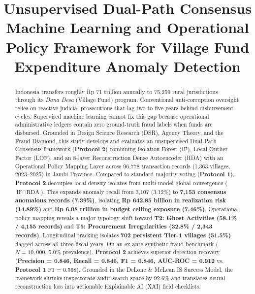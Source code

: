 \documentclass[conference]{IEEEtran}
\begin{document}
\title{Unsupervised Dual-Path Consensus Machine Learning and Operational Policy Framework for Village Fund Expenditure Anomaly Detection}

\author{
}

\maketitle

\begin{abstract}
Indonesia transfers roughly Rp 71 trillion annually to 75,259 rural jurisdictions through its \textit{Dana Desa} (Village Fund) program. Conventional anti-corruption oversight relies on reactive judicial prosecutions that lag two to five years behind disbursement cycles. Supervised machine learning cannot fix this gap because operational administrative ledgers contain zero ground-truth fraud labels when funds are disbursed. Grounded in Design Science Research (DSR), Agency Theory, and the Fraud Diamond, this study develops and evaluates an unsupervised Dual-Path Consensus framework (\textbf{Protocol 2}) combining Isolation Forest (IF), Local Outlier Factor (LOF), and an 8-layer Reconstruction Dense Autoencoder (RDA) with an Operational Policy Mapping Layer across 96,778 transaction records (1,363 villages, 2023--2025) in Jambi Province. Compared to standard majority voting (\textbf{Protocol 1}), \textbf{Protocol 2} decouples local density isolates from multi-model global convergence ($\text{IF} \cap \text{RDA}$). This expands anomaly recall from 3,107 (3.12\%) to \textbf{7,153 consensus anomalous records (7.39\%)}, isolating \textbf{Rp 642.85 billion in realization risk (14.89\%)} and \textbf{Rp 6.08 trillion in budget ceiling exposure (7.46\%)}. Operational policy mapping reveals a major typology shift toward \textbf{T2: Ghost Activities (58.1\% / 4,155 records)} and \textbf{T5: Procurement Irregularities (32.8\% / 2,343 records)}. Longitudinal tracking isolates \textbf{702 persistent Tier-1 villages (51.5\%)} flagged across all three fiscal years. On an ex-ante synthetic fraud benchmark ($N=10,000$, 5.0\% prevalence), \textbf{Protocol 2} achieves superior detection recovery (\textbf{Precision = 0.846, Recall = 0.846, F1 = 0.846, AUC-ROC = 0.912} vs. \textbf{Protocol 1} F1 = 0.568). Grounded in the DeLone \& McLean IS Success Model, the framework shrinks inspectorate audit search space by 92.6\% and translates neural reconstruction loss into actionable Explainable AI (XAI) field checklists.
\end{abstract}
\end{document}
